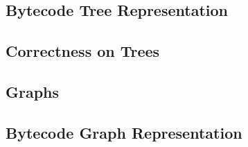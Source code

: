     \subsection{Bytecode Tree Representation}
        

    \subsection{Correctness on Trees}

    \subsection{Graphs}

        
 
    \subsection{Bytecode Graph Representation}
        
 
